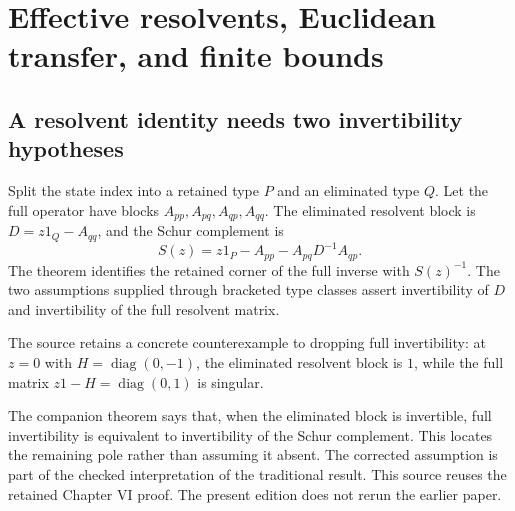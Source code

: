 \section{Effective resolvents, Euclidean transfer, and finite bounds}
\label{sec:finite-limits}

\subsection{A resolvent identity needs two invertibility hypotheses}
Split the state index into a retained type $P$ and an eliminated type $Q$. Let the full operator have blocks $A_{pp},A_{pq},A_{qp},A_{qq}$. The eliminated resolvent block is $D=z1_Q-A_{qq}$, and the Schur complement is
\[
S(z)=z1_P-A_{pp}-A_{pq}D^{-1}A_{qp}.
\]
The theorem identifies the retained corner of the full inverse with $S(z)^{-1}$. The two assumptions supplied through bracketed type classes assert invertibility of $D$ and invertibility of the full resolvent matrix.




The source retains a concrete counterexample to dropping full invertibility: at $z=0$ with $H=\operatorname{diag}(0,-1)$, the eliminated resolvent block is $1$, while the full matrix $z1-H=\operatorname{diag}(0,1)$ is singular.


The companion  theorem says that, when the eliminated block is invertible, full invertibility is equivalent to invertibility of the Schur complement. This locates the remaining pole rather than assuming it absent. The corrected assumption is part of the checked interpretation of the traditional result. This source reuses the retained Chapter VI proof. The present edition does not rerun the earlier paper.

